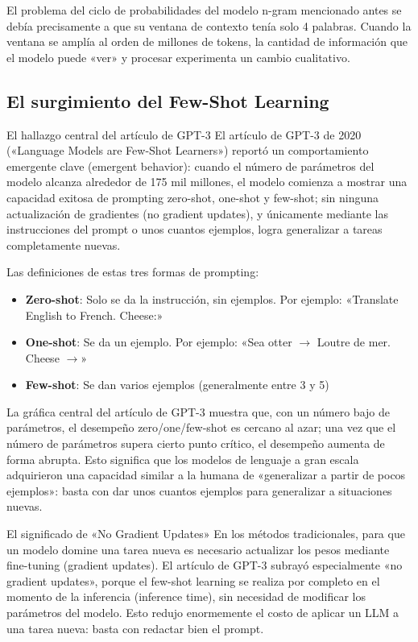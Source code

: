 El problema del ciclo de probabilidades del modelo n-gram mencionado antes se debía precisamente a que su ventana de contexto tenía solo 4 palabras. Cuando la ventana se amplía al orden de millones de tokens, la cantidad de información que el modelo puede «ver» y procesar experimenta un cambio cualitativo.

\subsection{El surgimiento del Few-Shot Learning}

\begin{importantbox}{El hallazgo central del artículo de GPT-3}
El artículo de GPT-3 de 2020 («Language Models are Few-Shot Learners») reportó un comportamiento emergente clave (emergent behavior): cuando el número de parámetros del modelo alcanza alrededor de 175 mil millones, el modelo comienza a mostrar una capacidad exitosa de prompting zero-shot, one-shot y few-shot; sin ninguna actualización de gradientes (no gradient updates), y únicamente mediante las instrucciones del prompt o unos cuantos ejemplos, logra generalizar a tareas completamente nuevas.
\end{importantbox}

Las definiciones de estas tres formas de prompting:

\begin{itemize}
    \item \textbf{Zero-shot}: Solo se da la instrucción, sin ejemplos. Por ejemplo: «Translate English to French. Cheese:»
    \item \textbf{One-shot}: Se da un ejemplo. Por ejemplo: «Sea otter $\rightarrow$ Loutre de mer. Cheese $\rightarrow$»
    \item \textbf{Few-shot}: Se dan varios ejemplos (generalmente entre 3 y 5)
\end{itemize}

La gráfica central del artículo de GPT-3 muestra que, con un número bajo de parámetros, el desempeño zero/one/few-shot es cercano al azar; una vez que el número de parámetros supera cierto punto crítico, el desempeño aumenta de forma abrupta. Esto significa que los modelos de lenguaje a gran escala adquirieron una capacidad similar a la humana de «generalizar a partir de pocos ejemplos»: basta con dar unos cuantos ejemplos para generalizar a situaciones nuevas.

\begin{knowledgebox}{El significado de «No Gradient Updates»}
En los métodos tradicionales, para que un modelo domine una tarea nueva es necesario actualizar los pesos mediante fine-tuning (gradient updates). El artículo de GPT-3 subrayó especialmente «no gradient updates», porque el few-shot learning se realiza por completo en el momento de la inferencia (inference time), sin necesidad de modificar los parámetros del modelo. Esto redujo enormemente el costo de aplicar un LLM a una tarea nueva: basta con redactar bien el prompt.
\end{knowledgebox}


